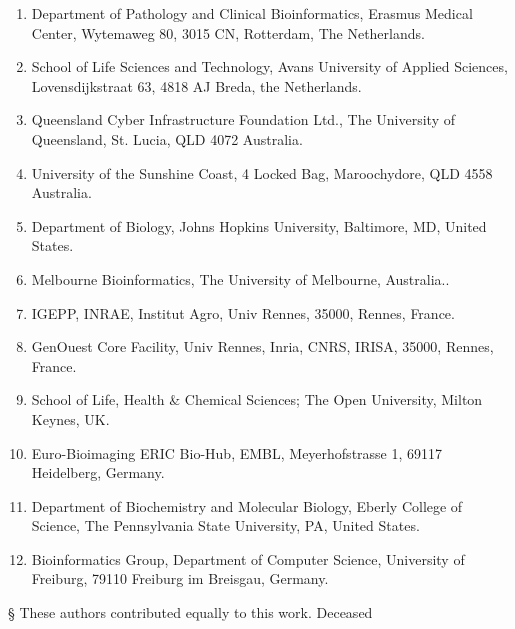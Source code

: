 \begin{enumerate}
\itemsep-0.5em
\item Department of Pathology and Clinical Bioinformatics, Erasmus Medical Center, Wytemaweg 80, 3015 CN, Rotterdam, The Netherlands.\label{tiaas-affil:1}
\item School of Life Sciences and Technology, Avans University of Applied Sciences, Lovensdijkstraat 63, 4818 AJ Breda, the Netherlands.\label{tiaas-affil:2}
\item Queensland Cyber Infrastructure Foundation Ltd., The University of Queensland, St. Lucia, QLD 4072 Australia.\label{tiaas-affil:3}
\item University of the Sunshine Coast, 4 Locked Bag, Maroochydore, QLD 4558 Australia.\label{tiaas-affil:4}
\item Department of Biology, Johns Hopkins University, Baltimore, MD, United States.\label{tiaas-affil:5}
\item Melbourne Bioinformatics, The University of Melbourne, Australia..\label{tiaas-affil:6}
\item IGEPP, INRAE, Institut Agro, Univ Rennes, 35000, Rennes, France.\label{tiaas-affil:7}
\item GenOuest Core Facility, Univ Rennes, Inria, CNRS, IRISA, 35000, Rennes, France.\label{tiaas-affil:8}
\item School of Life, Health \& Chemical Sciences; The Open University, Milton Keynes, UK.\label{tiaas-affil:9}
\item Euro-Bioimaging ERIC Bio-Hub, EMBL, Meyerhofstrasse 1, 69117 Heidelberg, Germany.\label{tiaas-affil:10}
\item Department of Biochemistry and Molecular Biology, Eberly College of Science, The Pennsylvania State University, PA, United States.\label{tiaas-affil:11}
\item Bioinformatics Group, Department of Computer Science, University of Freiburg, 79110 Freiburg im Breisgau, Germany.\label{tiaas-affil:12}
\end{enumerate}


§ These authors contributed equally to this work.
\dag Deceased
\normalsize

